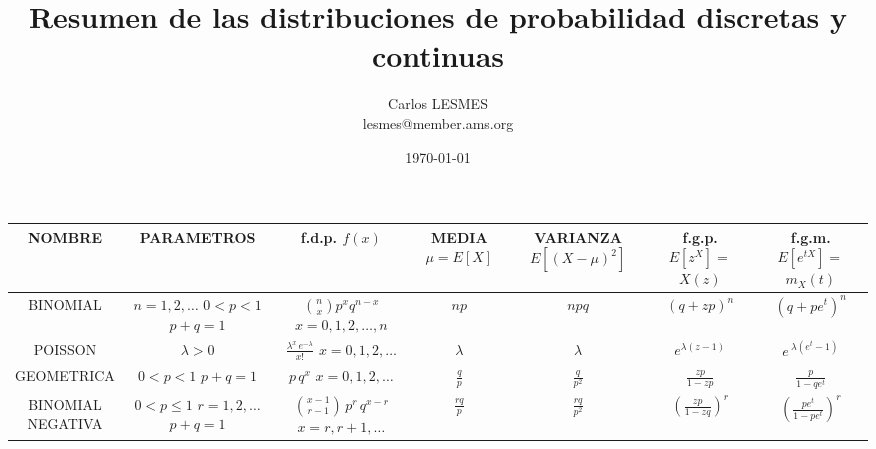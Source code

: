 \documentclass[12pt]{report}
\title{Resumen de las distribuciones de probabilidad discretas y continuas}
\author{Carlos LESMES\\lesmes@member.ams.org}
\date{\today}
\begin{document}
\maketitle
\newpage
\pagestyle{empty}
\begin{landscape}
\begin{tabular}{|c|c|c|c|c|c|c|}
\hline 
\parbox[c][2\height][c]{1.2in}{NOMBRE} & \parbox[c][2\height][c]{1.2in}{PARAMETROS} & \parbox[c][2\height][c]{1.3in}{f.d.p. \\ $ f(x) $}  & \parbox[c][2\height][c]{0.8in}{MEDIA \\$ \mu=E[X] $} & \parbox[c][2\height][c]{1in}{ VARIANZA \\$ E[(X-\mu)^{2}] $}& \parbox[c][2\height][c]{0.8in}{ f.g.p. \\$
E[z^{X}]=$\\$X(z)$} & \parbox[c][2\height][c]{1in}{f.g.m. \\$ E[e^{tX}]=$\\$m_{X}(t)$}\\ 
\hline 
\parbox[c][2\height][c]{1.2in}{BINOMIAL} & \parbox[c][2\height][c]{1.2in}{$ n=1,2,\dots $\\$ 0 < p < 1 $\\$ p+q=1 $} & \parbox[c][2\height][c]{1.3in}{$ \displaystyle \binom{n}{x}p^{x}q^{n-x} $\\$ x=0,1,2,\dots,n $} &  $ np $ & $ npq $ & $ (q+zp)^{n}$ & $ (q+pe^{t})^{n} $\\ 
\hline 
\parbox[c][2\height][c]{1.2in}{POISSON }& \parbox[c][2\height][c]{1.2in}{$ \lambda > 0 $} & \parbox[c][2\height][c]{1.3in}{$ \displaystyle \frac{\lambda^{x}\, e^{-\lambda}}{x!} $ \\ $ x=0,1,2,\dots $} & $ \lambda $ & $ \lambda $ & $ e^{\lambda(z-1)} $ & $ e\, ^{\lambda \displaystyle (e^{t}-1)} $\\ 
\hline 
\parbox[c][2\height][c]{1.2in}{GEOMETRICA} & \parbox[c][2\height][c]{1.2in}{$ 0< p < 1 $\\$ p+q=1 $} & \parbox[c][2\height][c]{1.3in}{ $ p\, q^{x} $ \\ $ x=0,1,2,\dots $}  & $ \displaystyle \frac{q}{p} $& $ \displaystyle \frac{q}{p^{2}} $ & $ \displaystyle \frac{zp}{1-zp} $ & $ \displaystyle \frac{p}{1-qe^{t}} $\\ 
\hline 
\parbox[c][2\height][c]{1.2in}{BINOMIAL\\ NEGATIVA} & \parbox[c][2\height][c]{1.2in}{ $ 0< p \leq 1 $ \\ $ r=1,2,\dots $\\ $ p+q=1 $} & \parbox[c][2\height][c]{1.3in}{$ \displaystyle \binom{x-1}{r-1}\,p^{r}\, q^{x-r} $ \\ $ x=r,r+1,\dots $} & $ \displaystyle \frac{rq}{p} $ & $ \displaystyle \frac{rq}{p^{2}} $ & $ \left( \displaystyle \frac{zp}{1-zq} \right) ^{r} $ & $ \left(\displaystyle \frac{pe^{t}}{1-pe^{t}}\right)^{r} $\\ 
\hline 
\end{tabular} 
\end{landscape}
\end{document}
